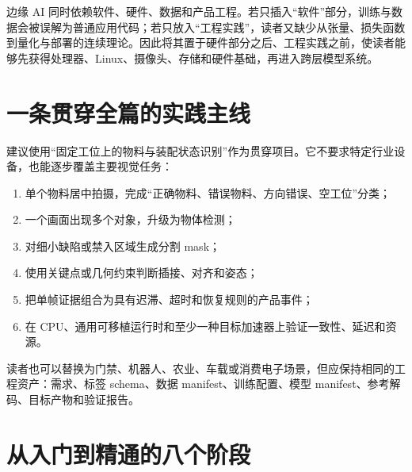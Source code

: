 边缘 AI 同时依赖软件、硬件、数据和产品工程。若只插入“软件”部分，训练与数据会被误解为普通应用代码；若只放入“工程实践”，读者又缺少从张量、损失函数到量化与部署的连续理论。因此将其置于硬件部分之后、工程实践之前，使读者能够先获得处理器、Linux、摄像头、存储和硬件基础，再进入跨层模型系统。

\section{一条贯穿全篇的实践主线}

建议使用“固定工位上的物料与装配状态识别”作为贯穿项目。它不要求特定行业设备，也能逐步覆盖主要视觉任务：

\begin{enumerate}
  \item 单个物料居中拍摄，完成“正确物料、错误物料、方向错误、空工位”分类；
  \item 一个画面出现多个对象，升级为物体检测；
  \item 对细小缺陷或禁入区域生成分割 mask；
  \item 使用关键点或几何约束判断插接、对齐和姿态；
  \item 把单帧证据组合为具有迟滞、超时和恢复规则的产品事件；
  \item 在 CPU、通用可移植运行时和至少一种目标加速器上验证一致性、延迟和资源。
\end{enumerate}

读者也可以替换为门禁、机器人、农业、车载或消费电子场景，但应保持相同的工程资产：需求、标签 schema、数据 manifest、训练配置、模型 manifest、参考解码、目标产物和验证报告。

\section{从入门到精通的八个阶段}

